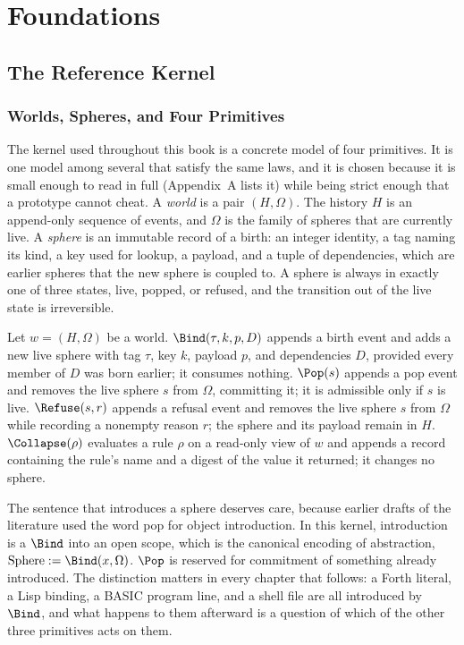 \part{Foundations}

\chapter{The Reference Kernel}

\section{Worlds, Spheres, and Four Primitives}

The kernel used throughout this book is a concrete model of four primitives. It is one model among several that satisfy the same laws, and it is chosen because it is small enough to read in full (Appendix~A lists it) while being strict enough that a prototype cannot cheat. A \emph{world} is a pair $(H,\Omega)$. The history $H$ is an append-only sequence of events, and $\Omega$ is the family of spheres that are currently live. A \emph{sphere} is an immutable record of a birth: an integer identity, a tag naming its kind, a key used for lookup, a payload, and a tuple of dependencies, which are earlier spheres that the new sphere is coupled to. A sphere is always in exactly one of three states, live, popped, or refused, and the transition out of the live state is irreversible.

\begin{definition}[Primitives]
Let $w=(H,\Omega)$ be a world. $\Bind(\tau,k,p,D)$ appends a birth event and adds a new live sphere with tag $\tau$, key $k$, payload $p$, and dependencies $D$, provided every member of $D$ was born earlier; it consumes nothing. $\Pop(s)$ appends a pop event and removes the live sphere $s$ from $\Omega$, committing it; it is admissible only if $s$ is live. $\Refuse(s,r)$ appends a refusal event and removes the live sphere $s$ from $\Omega$ while recording a nonempty reason $r$; the sphere and its payload remain in $H$. $\Collapse(\rho)$ evaluates a rule $\rho$ on a read-only view of $w$ and appends a record containing the rule's name and a digest of the value it returned; it changes no sphere.
\end{definition}

The sentence that introduces a sphere deserves care, because earlier drafts of the \SP{} literature used the word pop for object introduction. In this kernel, introduction is a $\Bind$ into an open scope, which is the canonical encoding of abstraction, $\mathrm{Sphere}:=\Bind(x,\Omega)$. $\Pop$ is reserved for commitment of something already introduced. The distinction matters in every chapter that follows: a Forth literal, a Lisp binding, a BASIC program line, and a shell file are all introduced by $\Bind$, and what happens to them afterward is a question of which of the other three primitives acts on them.

